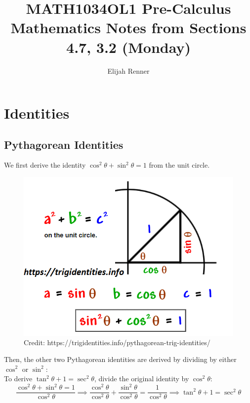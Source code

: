 \documentclass[12pt]{article}
\title{MATH1034OL1 Pre-Calculus Mathematics Notes from Sections 4.7, 3.2 (Monday)}
\author{Elijah Renner}
\begin{document}
\maketitle

\vspace{0.5in}

\tableofcontents

\section{Identities}

\subsection{Pythagorean Identities}

We first derive the identity \(\cos^2\theta + \sin^2\theta = 1\) from the unit circle.\\

\begin{figure}[H]
	\centering
	\includegraphics[scale=0.4]{Pythagorean Identity.png}
	\caption{Credit: https://trigidentities.info/pythagorean-trig-identities/}
\end{figure}

Then, the other two Pythagorean identities are derived by dividing by either \(\cos^2\) or \(\sin^2\):\\

To derive \(\tan^2\theta+1=\sec^2\theta\), divide the original identity by \(\cos^2\theta\):\\

\[\frac{\cos^2\theta + \sin^2\theta = 1}{\cos^2\theta}\implies\frac{\cos^2\theta}{\cos^2\theta}+\frac{\sin^2\theta}{\cos^2\theta}=\frac{1}{\cos^2\theta}\implies\tan^2\theta+1=\sec^2\theta\]
\end{document}
